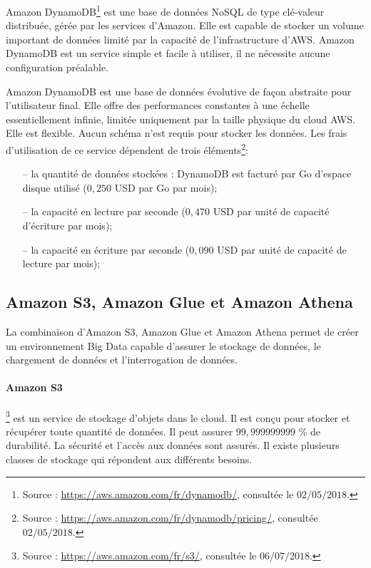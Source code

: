 	
	Amazon DynamoDB\footnote{Source : \url{https://aws.amazon.com/fr/dynamodb/}, consultée le $02/05/2018$.} est une base de données NoSQL de type clé-valeur distribuée, gérée par les services d'Amazon. Elle est capable de stocker un volume important de données limité par la capacité de l'infrastructure d'AWS. Amazon DynamoDB   est un service  simple et facile à utiliser,  il ne nécessite aucune configuration préalable. 
	
	Amazon DynamoDB  est une base de données évolutive de façon abstraite pour l'utilisateur final. Elle offre des performances constantes à une échelle essentiellement infinie, limitée uniquement par la taille physique du cloud AWS. Elle est flexible. Aucun schéma n'est requis pour stocker les données. Les frais d'utilisation de ce service dépendent de trois éléments\footnote{Source : \url{https://aws.amazon.com/fr/dynamodb/pricing/}, consultée $02/05/2018$.}:
	\begin{itemize}
		\item[--] la quantité de données stockées : DynamoDB est facturé par Go d'espace disque utilisé ($ 0,250 $ USD par Go par mois);
		\item[--] la capacité en lecture par seconde ($ 0,470 $ USD par unité de capacité d'écriture par mois);
		\item[--]  la capacité en écriture par seconde ($ 0,090 $ USD par unité de capacité de lecture par mois);
	\end{itemize}

\subsection{Amazon S3, Amazon Glue et Amazon Athena }

La combinaison d'Amazon S3, Amazon Glue et Amazon Athena permet de créer un environnement Big Data capable d'assurer le stockage de données, le chargement de données  et l'interrogation de données. 


\paragraph{Amazon S3}
\footnote{Source : \url{https://aws.amazon.com/fr/s3/}, consultée le $06/07/2018$.} est un service de stockage d'objets dans le cloud. Il est conçu pour stocker et  récupérer toute quantité de données. Il peut assurer $ 99,999999999 $ \% de durabilité. La sécurité  et l'accès aux données sont assurés. Il existe plusieurs classes de stockage qui répondent aux différents besoins. 


